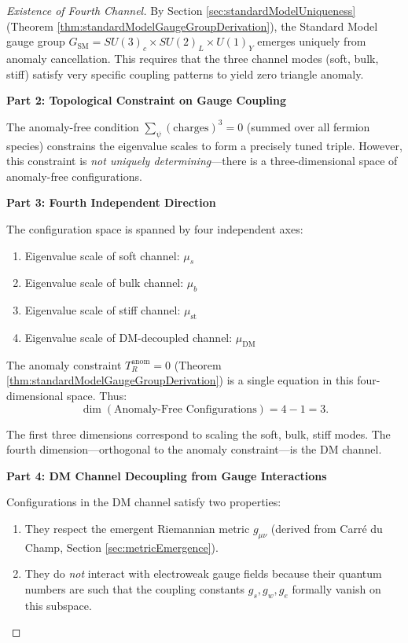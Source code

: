 \begin{theorem}
\begin{proof}[Existence of Fourth Channel]
By Section \ref{sec:standardModelUniqueness} (Theorem \ref{thm:standardModelGaugeGroupDerivation}), the Standard Model gauge group $G_{\text{SM}} = SU(3)_c \times SU(2)_L \times U(1)_Y$ emerges uniquely from anomaly cancellation. This requires that the three channel modes (soft, bulk, stiff) satisfy very specific coupling patterns to yield zero triangle anomaly.

\textbf{Part 2: Topological Constraint on Gauge Coupling}

The anomaly-free condition $\sum_{\psi} (\text{charges})^3 = 0$ (summed over all fermion species) constrains the eigenvalue scales to form a precisely tuned triple. However, this constraint is \textit{not uniquely determining}---there is a three-dimensional space of anomaly-free configurations.

\textbf{Part 3: Fourth Independent Direction}

The configuration space is spanned by four independent axes:
\begin{enumerate}
\item Eigenvalue scale of soft channel: $\mu_s$
\item Eigenvalue scale of bulk channel: $\mu_b$
\item Eigenvalue scale of stiff channel: $\mu_{\text{st}}$
\item Eigenvalue scale of DM-decoupled channel: $\mu_{\text{DM}}$
\end{enumerate}

The anomaly constraint $T_R^{\text{anom}} = 0$ (Theorem \ref{thm:standardModelGaugeGroupDerivation}) is a single equation in this four-dimensional space. Thus:
\begin{equation}
\dim(\text{Anomaly-Free Configurations}) = 4 - 1 = 3.
\end{equation}

The first three dimensions correspond to scaling the soft, bulk, stiff modes. The fourth dimension---orthogonal to the anomaly constraint---is the DM channel.

\textbf{Part 4: DM Channel Decoupling from Gauge Interactions}

Configurations in the DM channel satisfy two properties:
\begin{enumerate}
\item They respect the emergent Riemannian metric $g_{\mu\nu}$ (derived from Carré du Champ, Section \ref{sec:metricEmergence}).
\item They do \textit{not} interact with electroweak gauge fields because their quantum numbers are such that the coupling constants $g_s, g_w, g_e$ formally vanish on this subspace.
\end{enumerate}


\end{proof}
\end{theorem}
